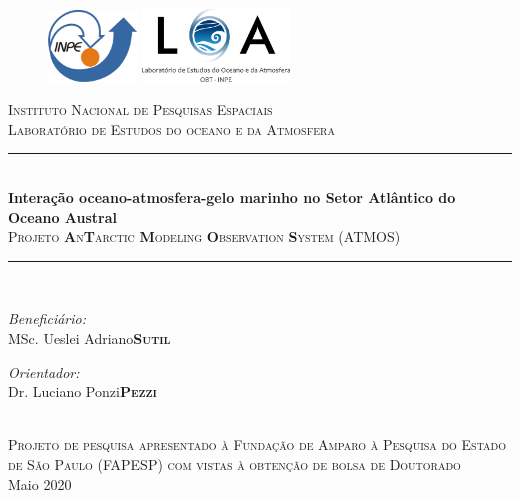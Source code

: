 \documentclass{article}
\title{\thesistitle}
\author{\thesisauthorfirst\space\thesisauthorsecond}
\date{\thesisdate}
\def\thesistitle{Interação oceano-atmosfera-gelo marinho no Setor Atlântico do Oceano Austral}
\def\thesissubtitle{Projeto \textbf{A}n\textbf{T}arctic \textbf{M}odeling \textbf{O}bservation \textbf{S}ystem (ATMOS)}
\def\thesisauthorfirst{MSc. Ueslei Adriano}
\def\thesisauthorsecond{\textbf{Sutil}}
\def\thesissupervisorfirst{Dr. Luciano Ponzi}
\def\thesissupervisorsecond{\textbf{Pezzi}}
\def\thesisdate{Maio 2020}
\begin{document}
\begin{titlepage}
	\thispagestyle{empty}
	\begin{figure}
		\centering
		\vspace*{\fill}
		\includegraphics[width=0.21\textwidth]{img/inpe.png}
		\hfill
		\includegraphics[width=0.35\textwidth]{img/loa.png}
		\vspace{0.3cm}
	\end{figure}
	\newcommand{\HRule}{\rule{\linewidth}{0.6mm}}
	\center
	\textsc{\LARGE Instituto Nacional de Pesquisas Espaciais}\\[0.3cm]
	\textsc{\large Laboratório de Estudos do oceano e da Atmosfera}\\[2cm]
	\HRule \\[0.7cm]
	{ \huge \bfseries \thesistitle}\\[1cm]
	\textsc{\thesissubtitle}\\
	\HRule \\[2cm]
	\begin{minipage}{.4\textwidth}
	\begin{flushleft} \large
	\emph{Beneficiário:}\\
	\thesisauthorfirst\space \textsc{\thesisauthorsecond}
	\end{flushleft}
	\end{minipage}
	\begin{minipage}{0.4\textwidth}
	\begin{flushright} \large
	\emph{Orientador:} \\
	\thesissupervisorfirst\space \textsc{\thesissupervisorsecond} \\[1em]
	\end{flushright}
	\end{minipage}\\[2.5cm]
	\textsc{\large Projeto de pesquisa apresentado à Fundação de Amparo à Pesquisa do Estado de São
	Paulo (FAPESP) com vistas à obtenção de bolsa de Doutorado}\\[3cm]
	\vfill
	{\large \thesisdate}\\
	\clearpage
\end{titlepage}
\end{document}
